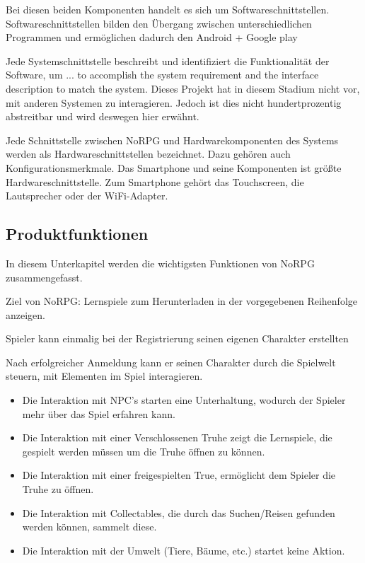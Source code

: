 		Bei diesen beiden Komponenten handelt es sich um Softwareschnittstellen. Softwareschnittstellen bilden den Übergang zwischen unterschiedlichen Programmen und ermöglichen dadurch den Android + Google play
	
		Jede Systemschnittstelle beschreibt und identifiziert die Funktionalität der Software, um ... to accomplish the system requirement and the interface description to match the system. Dieses Projekt hat in diesem Stadium nicht vor, mit anderen Systemen zu interagieren. Jedoch ist dies nicht hundertprozentig abstreitbar und wird deswegen hier erwähnt.

		Jede Schnittstelle zwischen NoRPG und Hardwarekomponenten des Systems werden als Hardwareschnittstellen bezeichnet. Dazu gehören auch Konfigurationsmerkmale. Das Smartphone und seine Komponenten ist größte Hardwareschnittstelle. Zum Smartphone gehört das Touchscreen, die Lautsprecher oder der WiFi-Adapter. %

	\subsection{Produktfunktionen}
		In diesem Unterkapitel werden die wichtigsten Funktionen von NoRPG zusammengefasst.
		
		Ziel von NoRPG: Lernspiele zum Herunterladen in der vorgegebenen Reihenfolge anzeigen.
		
		Spieler kann einmalig bei der Registrierung seinen eigenen Charakter erstellten 
		
		Nach erfolgreicher Anmeldung kann er seinen Charakter durch die Spielwelt steuern, mit Elementen im Spiel interagieren.
		
		\begin{itemize}
			\item{Die Interaktion mit NPC's starten eine Unterhaltung, wodurch der Spieler mehr über das Spiel erfahren kann.}
			\item{Die Interaktion mit einer Verschlossenen Truhe zeigt die Lernspiele, die gespielt werden müssen um die Truhe öffnen zu können.}
			\item{Die Interaktion mit einer freigespielten True, ermöglicht dem Spieler die Truhe zu öffnen.}
			\item{Die Interaktion mit Collectables, die durch das Suchen/Reisen gefunden werden können, sammelt diese.}
			\item{Die Interaktion mit der Umwelt (Tiere, Bäume, etc.) startet keine Aktion.}
		\end{itemize}
		
